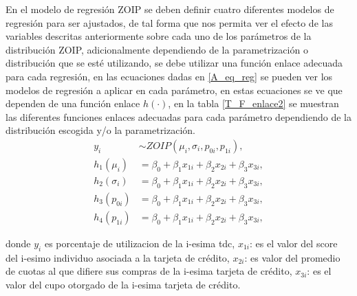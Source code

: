 En el modelo de regresi\'{o}n ZOIP se deben definir cuatro diferentes modelos de regresi\'{o}n para ser ajustados, de tal forma que nos permita ver el efecto de las variables descritas anteriormente sobre cada uno de los par\'{a}metros de la distribuci\'{o}n ZOIP, adicionalmente dependiendo de la parametrizaci\'{o}n o distribuci\'{o}n que se est\'{e} utilizando, se debe utilizar una funci\'{o}n enlace adecuada para cada regresi\'{o}n, en las ecuaciones dadas en \eqref{A_eq_reg} se pueden ver los modelos de regresi\'{o}n a aplicar en cada par\'{a}metro, en estas ecuaciones se ve que dependen de una funci\'{o}n enlace $h(\cdot)$, en la tabla \ref{T_F_enlace2} se muestran las diferentes funciones enlaces adecuadas para cada par\'{a}metro dependiendo de la distribuci\'{o}n escogida y/o la parametrizaci\'{o}n.\\

\begin{equation}
\begin{split}
y_{i} & \sim ZOIP(\mu_{i},\sigma_{i},p_{0i}, p_{1i}),\\
h_1(\mu_{i}) &=\beta_0+\beta_1 x_{1i}+\beta_2 x_{2i}+\beta_3 x_{3i},\\
h_2(\sigma_{i}) &=\beta_0+\beta_1 x_{1i}+\beta_2 x_{2i}+\beta_3 x_{3i},\\
h_3(p_{0i}) &=\beta_0+\beta_1 x_{1i}+\beta_2 x_{2i}+\beta_3 x_{3i},\\
h_4(p_{1i}) &=\beta_0+\beta_1 x_{1i}+\beta_2 x_{2i}+\beta_3 x_{3i},
\end{split}
\label{A_eq_reg}
\end{equation}

donde $y_i$ es porcentaje de utilizacion de la i-esima tdc, $x_{1i}$: es el valor del score del i-esimo individuo asociada a la tarjeta de cr\'{e}dito, $x_{2i}$: es valor del promedio de cuotas al que difiere sus compras de la i-esima tarjeta de cr\'{e}dito, $x_{3i}$: es el valor del cupo otorgado de la i-esima tarjeta de cr\'{e}dito. 

